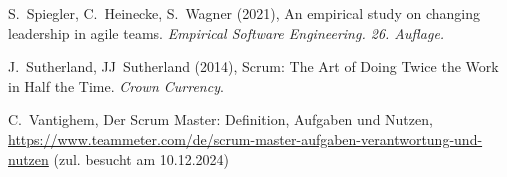 \documentclass[5pt, final]{beamer}
\begin{document}
\begin{frame}[t]
\begin{multicols}{3}
\begin{thebibliography}{99}
				 S.~Spiegler, C.~Heinecke, S.~Wagner (2021), An empirical study on changing leadership in agile teams. 
				\textit{Empirical Software Engineering. 26. Auflage.}
						                
                 J.~Sutherland, JJ~Sutherland (2014), Scrum: The Art of Doing Twice the Work in Half the Time. \textit{Crown Currency}.
                
                 C.~Vantighem, Der Scrum Master: Definition, Aufgaben und Nutzen, \url{https://www.teammeter.com/de/scrum-master-aufgaben-verantwortung-und-nutzen} (zul. besucht am 10.12.2024)            
 
                
               
				
			\end{thebibliography}
			
		\end{multicols}
		
	\end{frame}
\end{document}
